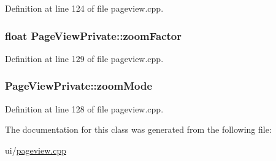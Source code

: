 Definition at line 124 of file pageview.\+cpp.

\hypertarget{classPageViewPrivate_a938411ef880f839b765aeac48a482b9e}{
\subsubsection[{zoom\+Factor}]{\setlength{\rightskip}{0pt plus 5cm}float Page\+View\+Private\+::zoom\+Factor}}\label{classPageViewPrivate_a938411ef880f839b765aeac48a482b9e}


Definition at line 129 of file pageview.\+cpp.

\hypertarget{classPageViewPrivate_a009f59f9f081ced030a81a8ca726c2b2}{
\subsubsection[{zoom\+Mode}]{ Page\+View\+Private\+::zoom\+Mode}}\label{classPageViewPrivate_a009f59f9f081ced030a81a8ca726c2b2}


Definition at line 128 of file pageview.\+cpp.



The documentation for this class was generated from the following file\+:\begin{DoxyCompactItemize}
\item 
ui/\hyperlink{pageview_8cpp}{pageview.\+cpp}\end{DoxyCompactItemize}
